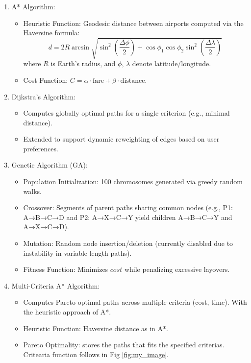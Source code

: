 \documentclass[conference]{IEEEtran}
\begin{document}
\begin{enumerate}
    \item A* Algorithm:  
        \begin{itemize}
            \item Heuristic Function: Geodesic distance between airports computed via the Haversine formula:  
              \[
              d = 2R \arcsin\sqrt{\sin^2\left(\frac{\Delta\phi}{2}\right) + \cos\phi_1 \cos\phi_2 \sin^2\left(\frac{\Delta\lambda}{2}\right)}
              \]  
              where \(R\) is Earth's radius, and \(\phi\), \(\lambda\) denote latitude/longitude.  
            \item Cost Function: \(C = \alpha \cdot \text{fare} + \beta \cdot \text{distance}\).  
        \end{itemize}
    
    \item Dijkstra's Algorithm:  
        \begin{itemize}
            \item Computes globally optimal paths for a single criterion (e.g., minimal distance).  
            \item Extended to support dynamic reweighting of edges based on user preferences.  
        \end{itemize}
    
    \item Genetic Algorithm (GA):  
        \begin{itemize}
            \item Population Initialization: 100 chromosomes generated via greedy random walks.  
            \item Crossover: Segments of parent paths sharing common nodes (e.g., P1: A→B→C→D and P2: A→X→C→Y yield children A→B→C→Y and A→X→C→D).  
            \item Mutation: Random node insertion/deletion (currently disabled due to instability in variable-length paths).  
            \item Fitness Function: Minimizes \(cost\) while penalizing excessive layovers.  
        \end{itemize}
    \item Multi-Criteria A* Algorithm:  
        \begin{itemize}
            \item Computes Pareto optimal paths across multiple criteria (cost, time). With the heuristic approach of A*.
            \item Heuristic Function: Haversine distance as in A*.
            \item Pareto Optimality: stores the paths that fits the specified criterias. Critearia function follows in Fig \ref{fig:my_image}. 
        \end{itemize}
\end{enumerate}
\end{document}
